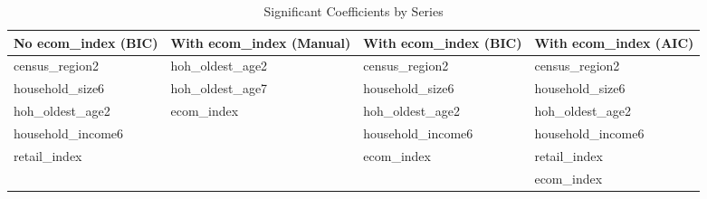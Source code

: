 \begin{table}[ht]
\centering
\caption{Significant Coefficients by Series} 
\label{tab:series_coefs}
\begin{tabular}{>{\centering\let\newline\\\arraybackslash\hspace{0pt}}m{3.50cm}>{\centering\let\newline\\\arraybackslash\hspace{0pt}}m{3.50cm}>{\centering\let\newline\\\arraybackslash\hspace{0pt}}m{3.50cm}>{\centering\let\newline\\\arraybackslash\hspace{0pt}}m{3.50cm}}
  \hline
No ecom\_index (BIC) & With ecom\_index (Manual) & With ecom\_index (BIC) & With ecom\_index (AIC) \\ 
  \hline
census\_region2 & hoh\_oldest\_age2 & census\_region2 & census\_region2 \\ 
  household\_size6 & hoh\_oldest\_age7 & household\_size6 & household\_size6 \\ 
  hoh\_oldest\_age2 & ecom\_index & hoh\_oldest\_age2 & hoh\_oldest\_age2 \\ 
  household\_income6 &  & household\_income6 & household\_income6 \\ 
  retail\_index &  & ecom\_index & retail\_index \\ 
   &  &  & ecom\_index \\ 
   \hline
\end{tabular}
\end{table}
